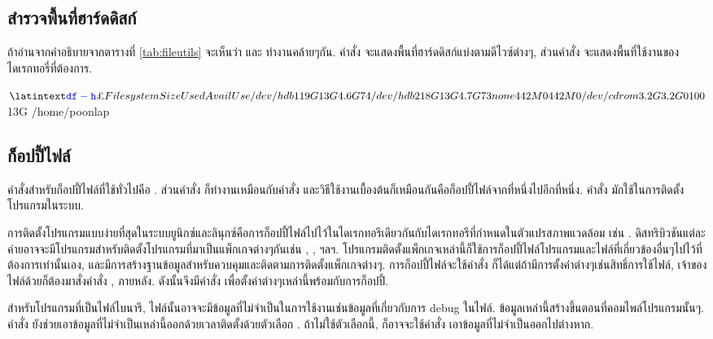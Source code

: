 \begin{thwbr}
\subsection{สำรวจพื้นที่ฮาร์ดดิสก์}
ถ้าอ่านจากคำอธิบายจากตารางที่ \ref{tab:fileutils} จะเห็นว่า  และ  ทำงานคล้ายๆกัน. คำสั่ง  จะแสดงพื้นที่ฮาร์ดดิสก์แบ่งตามดีไวซ์ต่างๆ, ส่วนคำสั่ง  จะแสดงพื้นที่ใช้งานของไดเรกทอรี่ที่ต้องการ.

\begin{MyExample}
\begin{MyEx}
$ \cin{df -h}
Filesystem            Size  Used Avail Use%
/dev/hdb1              19G   13G  4.6G  74%
/dev/hdb2              18G   13G  4.7G  73%
none                  442M     0  442M   0%
/dev/cdrom            3.2G  3.2G     0 100%
$ 
13G     /home/poonlap
\end{MyEx}
\end{MyExample}%

\subsection{ก็อปปี้ไฟล์}
คำสั่งสำหรับก็อปปี้ไฟล์ที่ใช้ทั่วไปคือ . ส่วนคำสั่ง  ก็ทำงานเหมือนกับคำสั่ง  และวิธีใช้งานเบื้องต้นก็เหมือนกันคือก็อปปี้ไฟล์จากที่หนึ่งไปอีกที่หนึ่ง. คำสั่ง  มักใช้ในการติดตั้งโปรแกรมในระบบ. 

การติดตั้งโปรแกรมแบบง่ายที่สุดในระบบยูนิกซ์และลินุกซ์คือการก็อปปี้ไฟล์ไปไว้ในไดเรกทอรีเดียวกันกับไดเรกทอรีที่กำหนดในตัวแปรสภาพแวดล้อม  เช่น . ดิสทริบิวชันแต่ละค่ายอาจจะมีโปรแกรมสำหรับติดตั้งโปรแกรมที่มาเป็นแพ็กเกจต่างๆกันเช่น , ,  ฯลฯ. โปรแกรมติดตั้งแพ็กเกจเหล่านี้ก็ใช้การก็อปปี้ไฟล์โปรแกรมและไฟล์ที่เกี่ยวข้องอื่นๆไปไว้ที่ต้องการเท่านั้นเอง, และมีการสร้างฐานข้อมูลสำหรับควบคุมและติดตามการติดตั้งแพ็กเกจต่างๆ. การก็อปปี้ไฟล์จะใช้คำสั่ง  ก็ได้แต่ถ้ามีการตั้งค่าต่างๆเช่นสิทธิ์การใช้ไฟล์, เจ้าของไฟล์ด้วยก็ต้องมาสั่งคำสั่ง ,  ภายหลัง. ดังนั้นจึงมีคำสั่ง  เพื่อตั้งค่าต่างๆเหล่านี้พร้อมกับการก็อปปี้.

สำหรับโปรแกรมที่เป็นไฟล์ไบนารี, ไฟล์นั้นอาจจะมีข้อมูลที่ไม่จำเป็นในการใช้งานเช่นข้อมูลที่เกี่ยวกับการ debug%
%
 ในไฟล์. ข้อมูลเหล่านี้สร้างขึ้นตอนที่คอมไพล์โปรแกรมนั้นๆ. คำสั่ง  ยังช่วยเอาข้อมูลที่ไม่จำเป็นเหล่านี้ออกด้วยเวลาติดตั้งด้วยตัวเลือก . ถ้าไม่ใช้ตัวเลือกนี้, ก็อาจจะใช้คำสั่ง  เอาข้อมูลที่ไม่จำเป็นออกไปต่างหาก. 


\end{thwbr}
